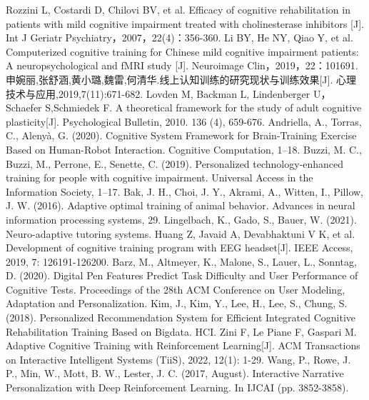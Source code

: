 \documentclass[12pt]{article}
\begin{document}
    
    \begin{thebibliography}{99}  

        Rozzini L, Costardi D, Chilovi BV, et al. Efficacy of cognitive rehabilitation in patients with mild cognitive impairment treated with cholinesterase inhibitors [J]. Int J Geriatr Psychiatry，2007，22(4)：356-360.
        Li BY, He NY, Qiao Y, et al. Computerized cognitive training for Chinese mild cognitive impairment patients: A neuropsychological and fMRI study [J]. Neuroimage Clin，2019，22：101691.
        申婉丽,张舒涵,黄小璐,魏雷,何清华.线上认知训练的研究现状与训练效果[J]. 心理技术与应用,2019,7(11):671-682.
        Lovden M, Backman L, Lindenberger U，Schaefer S,Schmiedek F. A theoretical framework for the study of adult cognitive plasticity[J]. Psychological Bulletin, 2010. 136 (4), 659-676.
        Andriella, A., Torras, C.,  Alenyà, G. (2020). Cognitive System Framework for Brain-Training Exercise Based on Human-Robot Interaction. Cognitive Computation, 1–18.
        Buzzi, M. C., Buzzi, M., Perrone, E., Senette, C. (2019). Personalized technology-enhanced training for people with cognitive impairment. Universal Access in the Information Society, 1–17. 
        Bak, J. H., Choi, J. Y., Akrami, A., Witten, I.,  Pillow, J. W. (2016). Adaptive optimal training of animal behavior. Advances in neural information processing systems, 29.
        Lingelbach, K., Gado, S.,  Bauer, W. (2021). Neuro-adaptive tutoring systems. 
        Huang Z, Javaid A, Devabhaktuni V K, et al. Development of cognitive training program with EEG headset[J]. IEEE Access, 2019, 7: 126191-126200.
        Barz, M., Altmeyer, K., Malone, S., Lauer, L., Sonntag, D. (2020). Digital Pen Features Predict Task Difficulty and User Performance of Cognitive Tests. Proceedings of the 28th ACM Conference on User Modeling, Adaptation and Personalization. 
        Kim, J., Kim, Y., Lee, H., Lee, S.,  Chung, S. (2018). Personalized Recommendation System for Efficient Integrated Cognitive Rehabilitation Training Based on Bigdata. HCI.
        Zini F, Le Piane F, Gaspari M. Adaptive Cognitive Training with Reinforcement Learning[J]. ACM Transactions on Interactive Intelligent Systems (TiiS), 2022, 12(1): 1-29.
        Wang, P., Rowe, J. P., Min, W., Mott, B. W.,  Lester, J. C. (2017, August). Interactive Narrative Personalization with Deep Reinforcement Learning. In IJCAI (pp. 3852-3858).

\end{thebibliography}
\end{document}
